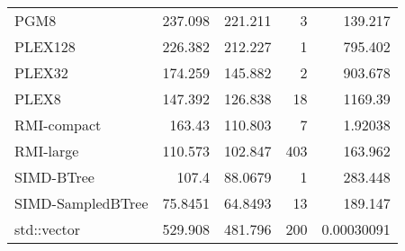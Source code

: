 \begin{tabular}{lrrrr}
 PGM8              &               237.098  &              221.211  &            3 &   139.217      \\
 PLEX128           &               226.382  &              212.227  &            1 &   795.402      \\
 PLEX32            &               174.259  &              145.882  &            2 &   903.678      \\
 PLEX8             &               147.392  &              126.838  &           18 &  1169.39       \\
 RMI-compact       &               163.43   &              110.803  &            7 &     1.92038    \\
 RMI-large         &               110.573  &              102.847  &          403 &   163.962      \\
 SIMD-BTree        &               107.4    &               88.0679 &            1 &   283.448      \\
 SIMD-SampledBTree &                75.8451 &               64.8493 &           13 &   189.147      \\
 std::vector       &               529.908  &              481.796  &          200 &     0.00030091 \\
\hline
\end{tabular}